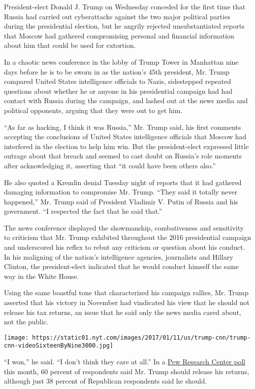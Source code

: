 President-elect Donald J. Trump on Wednesday conceded for the first time
that Russia had carried out cyberattacks against the two major political
parties during the presidential election, but he angrily rejected
unsubstantiated reports that Moscow had gathered compromising personal
and financial information about him that could be used for extortion.

In a chaotic news conference in the lobby of Trump Tower in Manhattan
nine days before he is to be sworn in as the nation's 45th president,
Mr. Trump compared United States intelligence officials to Nazis,
sidestepped repeated questions about whether he or anyone in his
presidential campaign had had contact with Russia during the campaign,
and lashed out at the news media and political opponents, arguing that
they were out to get him.

``As far as hacking, I think it was Russia,'' Mr. Trump said, his first
comments accepting the conclusions of United States intelligence
officials that Moscow had interfered in the election to help him win.
But the president-elect expressed little outrage about that breach and
seemed to cast doubt on Russia's role moments after acknowledging it,
asserting that ``it could have been others also.''

He also quoted a Kremlin denial Tuesday night of reports that it had
gathered damaging information to compromise Mr. Trump. ``They said it
totally never happened,'' Mr. Trump said of President Vladimir V. Putin
of Russia and his government. ``I respected the fact that he said
that.''

The news conference displayed the showmanship, combativeness and
sensitivity to criticism that Mr. Trump exhibited throughout the 2016
presidential campaign and underscored his reflex to rebut any criticism
or question about his conduct. In his maligning of the nation's
intelligence agencies, journalists and Hillary Clinton, the
president-elect indicated that he would conduct himself the same way in
the White House.

Using the same boastful tone that characterized his campaign rallies,
Mr. Trump asserted that his victory in November had vindicated his view
that he should not release his tax returns, an issue that he said only
the news media cared about, not the public.

\texttt{[image: https://static01.nyt.com/images/2017/01/11/us/trump-cnn/trump-cnn-videoSixteenByNine3000.jpg]}

``I won,'' he said. ``I don't think they care at all.'' In a
\href{http://www.people-press.org/2017/01/10/negative-views-of-trumps-transition-amid-concerns-about-conflicts-tax-returns/}{Pew
Research Center poll} this month, 60 percent of respondents said Mr.
Trump should release his returns, although just 38 percent of Republican
respondents said he should.

